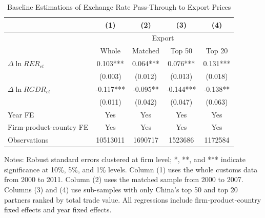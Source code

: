 \documentclass[12pt]{article}
\begin{document}
\begin{table}[htbp]
	\centering
	\caption{Baseline Estimations of Exchange Rate Pass-Through to Export Prices}
	\begin{threeparttable}
		\begin{tabular}{lcccc}
			\toprule
			& (1)   & (2)   & (3)   & (4) \\
			\midrule
			& \multicolumn{4}{c}{Export} \\
			& Whole & Matched & Top 50 & Top 20 \\
			\midrule
			$\Delta \ln RER_{ct}$ & 0.103*** & 0.064*** & 0.076*** & 0.131*** \\
			& (0.003) & (0.012) & (0.013) & (0.018) \\
			$\Delta \ln RGDR_{ct}$ &  -0.117*** & -0.095** & -0.144*** & -0.138** \\
			& (0.011) & (0.042) & (0.047) & (0.063) \\
			Year FE  & Yes   & Yes   & Yes   & Yes \\
			Firm-product-country FE & Yes   & Yes   & Yes   & Yes \\
			Observations & 10513011 & 1690717 & 1523686 & 1172584 \\
			\bottomrule
		\end{tabular}
		\begin{tablenotes}
			\footnotesize
			\item[Notes:] Robust standard errors clustered at firm level;  *, **, and *** indicate significance at 10\%, 5\%, and 1\% levels. Column (1) uses the whole customs data from 2000 to 2011. Column (2) uses the matched sample from 2000 to 2007. Columns (3) and (4) use sub-samples with only China's top 50 and top 20 partners ranked by total trade value. All regressions include firm-product-country fixed effects and year fixed effects. 
		\end{tablenotes}
	\end{threeparttable}
	\label{tab.baseline.exp}
\end{table}
\end{document}
